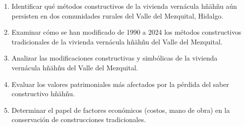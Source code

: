 
\begin{enumerate}
	\item{Identificar qué métodos constructivos de la vivienda vernácula hñähñu aún persisten en dos comunidades rurales del Valle del Mezquital, Hidalgo.}

	\item{Examinar cómo se han modificado de 1990 a 2024 los métodos constructivos tradicionales de la vivienda vernácula hñähñu del Valle del Mezquital.}

	\item{Analizar las modificaciones constructivas y simbólicas de la vivienda vernácula hñähñu del Valle del Mezquital.}

	\item{Evaluar los valores patrimoniales más afectados por la pérdida del saber constructivo hñähñu.}

	\item{Determinar el papel de factores económicos (costos, mano de obra) en la conservación de construcciones tradicionales.}
\end{enumerate}
